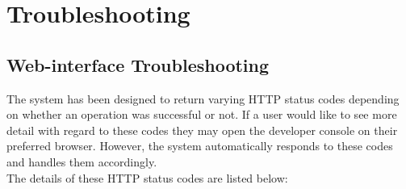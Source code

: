 \documentclass{article}
\begin{document}
\section{Troubleshooting}

\subsection{Web-interface Troubleshooting}
	The system has been designed to return varying HTTP status codes depending on whether an operation was successful or not. If a user would like to see more detail with regard to these codes they may open the developer console on their preferred browser. However, the system automatically responds to these codes and handles them accordingly.\\
	
	The details of these HTTP status codes are listed below:
\end{document}
